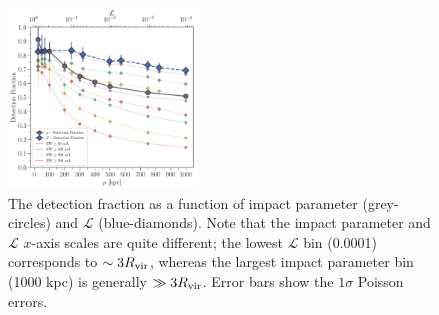 \documentclass[twocolumn,tighten]{aastex62}
\begin{document}
\begin{figure}[t!]
        \centering
        \vspace{0pt}
        \includegraphics[width=0.45\textwidth]{detection_fraction_min0_50_100_200_300_both_alt4.pdf}
        \caption{\small{The detection fraction as a function of impact parameter (grey-circles) and $\mathcal{L}$ (blue-diamonds). Note that the impact parameter and $\mathcal{L}$ $x$-axis scales are quite different; the lowest $\mathcal{L}$ bin (0.0001) corresponds to $\sim 3 R_{\rm vir}$, whereas the largest impact parameter bin (1000 kpc) is generally $\gg 3 R_{\rm vir}$. Error bars show the $1\sigma$ Poisson errors.}}
        \vspace{0pt}
        \label{detection_fraction}
\end{figure}
\end{document}
